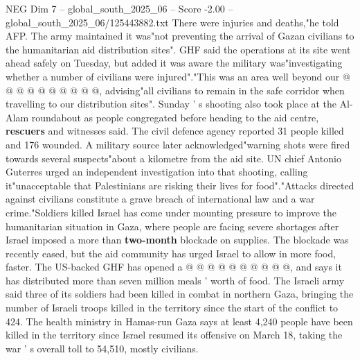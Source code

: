 \begin{textsample}{NEG Dim 7 – global\_south\_2025\_06 – Score -2.00 – global\_south\_2025\_06/125443882.txt}
There were injuries and deaths,"he told AFP.
The army maintained it was"not preventing the arrival of Gazan civilians to the humanitarian aid distribution sites".
GHF said the operations at its site went ahead safely on Tuesday, but added it was aware the military was"investigating whether a number of civilians were injured"."This was an area well beyond our @ @ @ @ @ @ @ @ @ @, advising"all civilians to remain in the safe corridor when travelling to our distribution sites".
Sunday ' s shooting also took place at the Al-Alam roundabout as people congregated before heading to the aid centre, \textbf{rescuers} and witnesses said.
The civil defence agency reported 31 people killed and 176 wounded.
A military source later acknowledged"warning shots were fired towards several suspects"about a kilometre from the aid site.
UN chief Antonio Guterres urged an independent investigation into that shooting, calling it"unacceptable that Palestinians are risking their lives for food"."Attacks directed against civilians constitute a grave breach of international law and a war crime."Soldiers killed Israel has come under mounting pressure to improve the humanitarian situation in Gaza, where people are facing severe shortages after Israel imposed a more than \textbf{two-month} blockade on supplies.
The blockade was recently eased, but the aid community has urged Israel to allow in more food, faster.
The US-backed GHF has opened a @ @ @ @ @ @ @ @ @ @, and says it has distributed more than seven million meals ' worth of food.
The Israeli army said three of its soldiers had been killed in combat in northern Gaza, bringing the number of Israeli troops killed in the territory since the start of the conflict to 424.
The health ministry in Hamas-run Gaza says at least 4,240 people have been killed in the territory since Israel resumed its offensive on March 18, taking the war ' s overall toll to 54,510, mostly civilians.

\end{textsample}
